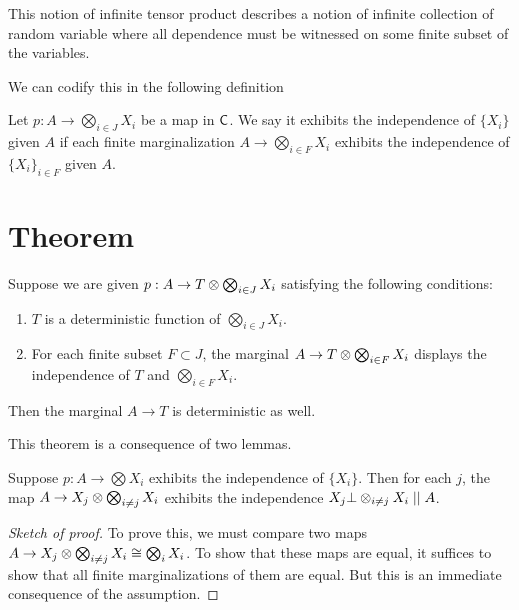 \documentclass[11pt]{article}
\begin{document}
This notion of infinite tensor product describes a notion of infinite collection of random variable where all dependence must be witnessed on some finite subset of the variables.

We can codify this in the following definition
\begin{definition}
    Let $p: A \to \bigotimes_{i\in J}X_i$ be a map in $\mathsf{C}$.
    We say it exhibits the independence of $\{X_i\}$ given $A$ if each finite marginalization $A \to \bigotimes_{i \in F}X_i$ exhibits the independence of $\{X_i\}_{i \in F}$ given $A$.
\end{definition}

\section{Theorem}
\begin{theorem}
    \label{thm:kolmog}
    Suppose we are given $p: A \to T \otimes \bigotimes_{i \in J} X_i$ satisfying the following conditions:
    \begin{enumerate}
        \item $T$ is a deterministic function of $\bigotimes_{i \in J} X_i$.
        \item For each finite subset $F \subset J$, the marginal $A \to T \otimes \bigotimes_{i \in F}X_i$ displays the independence of $T$ and $\bigotimes_{i \in F} X_i$.
    \end{enumerate}
    Then the marginal $A \to T$ is deterministic as well.
\end{theorem}

This theorem is a consequence of two lemmas.
\begin{lemma}
    Suppose $p: A \to \bigotimes X_i$ exhibits the independence of $\{X_i\}$.
    Then for each $j$, the map $A \to X_j \otimes \bigotimes_{i \neq j}X_i$ exhibits the independence $X_j \bot \otimes_{i\neq j} X_i \mid \mid A$.
\end{lemma}
\begin{proof}[Sketch of proof]
    To prove this, we must compare two maps $A \to X_j \otimes \bigotimes_{i\neq j} X_i \cong \bigotimes_i X_i$.
    To show that these maps are equal, it suffices to show that all finite marginalizations of them are equal.
    But this is an immediate consequence of the assumption.
\end{proof}
\end{document}
